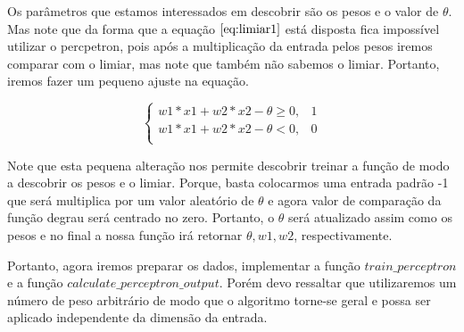 \documentclass[12pt]{article}
\begin{document}
 
  \par Os parâmetros que estamos interessados em descobrir são os pesos e o valor de $\theta$. Mas note que da forma que a equação $\ref{eq:limiar1}$ está disposta fica impossível utilizar o percpetron, pois após a multiplicação da entrada pelos pesos iremos comparar com o limiar, mas note que também não sabemos o limiar. Portanto, iremos fazer um pequeno ajuste na equação. 

\begin{equation}
    \left \{
      \begin{array}{cc}
      w1*x1 + w2*x2 - \theta \geq 0 , & 1 \\
      w1*x1 + w2*x2 - \theta < 0, & 0 \\
      \end{array}
      \right.
      \label{eq:limiar2}
\end{equation}

 \par Note que esta pequena alteração nos permite descobrir treinar a função de modo a descobrir os pesos e o limiar. Porque, basta colocarmos uma entrada padrão -1 que será multiplica por um valor aleatório de $\theta$ e agora valor de comparação da função degrau será centrado no zero. Portanto, o $\theta$ será atualizado assim como os pesos e no final a nossa função irá retornar $\theta, w1, w2$, respectivamente. 
      
  \par Portanto, agora iremos preparar os dados, implementar a função $train\_perceptron$ e a função $calculate\_perceptron\_output$. Porém devo ressaltar que utilizaremos um número de peso arbitrário de modo que o algoritmo torne-se geral e possa ser aplicado independente da dimensão da entrada.  
\end{document}
